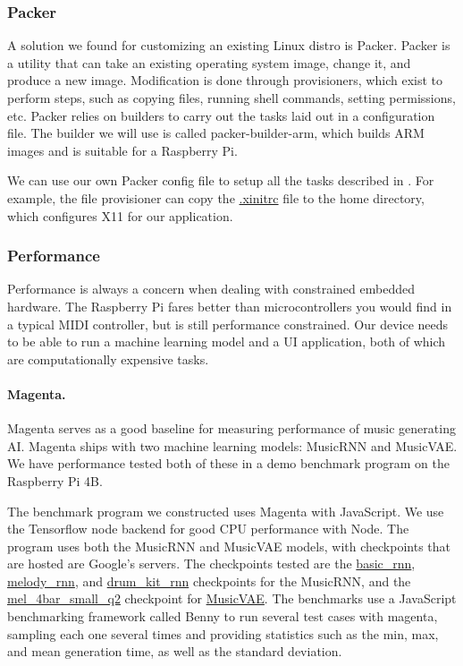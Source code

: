 \subsubsection{Packer}

A solution we found for customizing an existing Linux distro is Packer. Packer is a
utility that can take an existing operating system image, change it, and produce a new
image. Modification is done through provisioners, which exist to perform steps, such as
copying files, running shell commands, setting permissions, etc. Packer relies on builders
to carry out the tasks laid out in a configuration file. The builder we will use is called
packer-builder-arm, which builds ARM images and is suitable for a Raspberry Pi.

We can use our own Packer config file to setup all the tasks described in
. For example, the file provisioner can copy the
\url{.xinitrc} file to the home directory, which configures X11 for our application.

\subsubsection{Performance}

Performance is always a concern when dealing with constrained embedded hardware. The
Raspberry Pi fares better than microcontrollers you would find in a typical MIDI
controller, but is still performance constrained. Our device needs to be able to run a
machine learning model and a UI application, both of which are computationally expensive
tasks.

\paragraph{Magenta.}

Magenta serves as a good baseline for measuring performance of music generating AI.
Magenta ships with two machine learning models: MusicRNN and MusicVAE. We have performance
tested both of these in a demo benchmark program on the Raspberry Pi 4B.

The benchmark program we constructed uses Magenta with JavaScript. We use the Tensorflow
node backend for good CPU performance with Node. The program uses both the MusicRNN and
MusicVAE models, with checkpoints that are hosted are Google's servers. The checkpoints
tested are the \url{basic_rnn}, \url{melody_rnn}, and \url{drum_kit_rnn} checkpoints for
the MusicRNN, and the \url{mel_4bar_small_q2} checkpoint for \url{MusicVAE}. The benchmarks
use a JavaScript benchmarking framework called Benny to run several test cases with
magenta, sampling each one several times and providing statistics such as the min, max,
and mean generation time, as well as the standard deviation.

